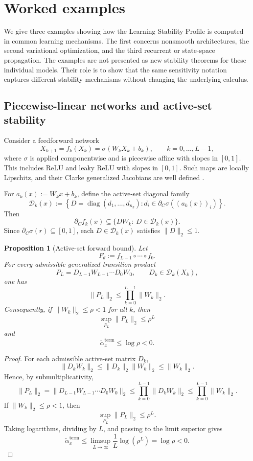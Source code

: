 \documentclass{article}
\newtheorem{proposition}[theorem]{Proposition}
\numberwithin{equation}{section}
\begin{document}
\section{Worked examples}
\label{sec:worked-examples}

We give three examples showing how the Learning Stability Profile is computed in
common learning mechanisms. The first concerns nonsmooth architectures, the
second variational optimization, and the third recurrent or state-space
propagation. The examples are not presented as new stability theorems for these
individual models. Their role is to show that the same sensitivity notation
captures different stability mechanisms without changing the underlying
calculus.

\subsection{Piecewise-linear networks and active-set stability}
\label{subsec:piecewise-linear-active-set}

Consider a feedforward network
\[
X_{k+1}
=
f_k(X_k)
=
\sigma(W_kX_k+b_k),
\qquad
k=0,\ldots,L-1,
\]
where \(\sigma\) is applied componentwise and is piecewise affine with slopes in
\([0,1]\). This includes ReLU and leaky ReLU with slopes in \([0,1]\). Such maps
are locally Lipschitz, and their Clarke generalized Jacobians are well defined
\cite{Clarke1990Optimization,Clarke1998Nonsmooth}.

For \(a_k(x):=W_kx+b_k\), define the active-set diagonal family
\[
\mathcal{D}_k(x)
:=
\left\{
D=\operatorname{diag}(d_1,\ldots,d_{n_k}):
d_i\in \partial_C\sigma((a_k(x))_i)
\right\}.
\]
Then
\[
\partial_C f_k(x)
\subseteq
\{DW_k:\ D\in\mathcal{D}_k(x)\}.
\]
Since \(\partial_C\sigma(r)\subseteq[0,1]\), each \(D\in\mathcal{D}_k(x)\)
satisfies \(\|D\|_2\le1\).

\begin{proposition}[Active-set forward bound]
\label{prop:active-set-forward-bound}
Let
\[
F_\theta:=f_{L-1}\circ\cdots\circ f_0 .
\]
For every admissible generalized transition product
\[
P_L
=
D_{L-1}W_{L-1}\cdots D_0W_0,
\qquad
D_k\in\mathcal{D}_k(X_k),
\]
one has
\[
\|P_L\|_2
\le
\prod_{k=0}^{L-1}\|W_k\|_2 .
\]
Consequently, if \(\|W_k\|_2\le\rho<1\) for all \(k\), then
\[
\sup_{P_L}\|P_L\|_2
\le
\rho^L
\]
and
\[
\tilde\alpha_x^{\mathrm{term}}
\le
\log\rho<0 .
\]
\end{proposition}

\begin{proof}
For each admissible active-set matrix \(D_k\),
\[
\|D_kW_k\|_2
\le
\|D_k\|_2\|W_k\|_2
\le
\|W_k\|_2 .
\]
Hence, by submultiplicativity,
\[
\|P_L\|_2
=
\|D_{L-1}W_{L-1}\cdots D_0W_0\|_2
\le
\prod_{k=0}^{L-1}\|D_kW_k\|_2
\le
\prod_{k=0}^{L-1}\|W_k\|_2 .
\]
If \(\|W_k\|_2\le\rho<1\), then
\[
\sup_{P_L}\|P_L\|_2
\le
\rho^L .
\]
Taking logarithms, dividing by \(L\), and passing to the limit superior gives
\[
\tilde\alpha_x^{\mathrm{term}}
\le
\limsup_{L\to\infty}\frac1L\log(\rho^L)
=
\log\rho<0 .
\]
\end{proof}
\end{document}
